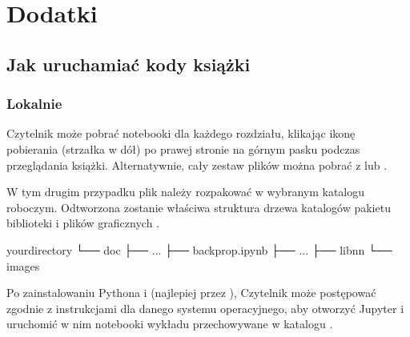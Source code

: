 \documentclass[a4paper,12pt,polish]{jupyterBook}
\begin{document}
\sphinxAtStartPar



\chapter{Dodatki}
\label{\detokenize{docs/appendix:dodatki}}\label{\detokenize{docs/appendix::doc}}

\section{Jak uruchamiać kody książki}
\label{\detokenize{docs/appendix:jak-uruchamiac-kody-ksiazki}}\label{\detokenize{docs/appendix:app-run}}

\subsection{Lokalnie}
\label{\detokenize{docs/appendix:lokalnie}}
\sphinxAtStartPar
Czytelnik może pobrać notebooki  dla każdego rozdziału, klikając ikonę pobierania (strzałka w dół) po prawej stronie na górnym pasku podczas przeglądania książki. Alternatywnie, cały zestaw plików można pobrać z
 lub .

\sphinxAtStartPar
W tym drugim przypadku plik  należy rozpakować w wybranym katalogu roboczym. Odtworzona zostanie właściwa struktura drzewa katalogów pakietu biblioteki  i plików graficznych .

\begin{sphinxVerbatim}[commandchars=\\\{\}]
your\PYGZus{}directory
└── doc
    ├── ...    
    ├── backprop.ipynb
    ├── ...    
    ├── lib\PYGZhy{}nn
    └── images
\end{sphinxVerbatim}

\sphinxAtStartPar
Po zainstalowaniu Pythona i  (najlepiej przez ), Czytelnik może postępować zgodnie z instrukcjami dla danego systemu operacyjnego, aby otworzyć Jupyter i uruchomić w nim notebooki wykładu przechowywane w katalogu .
\end{document}
